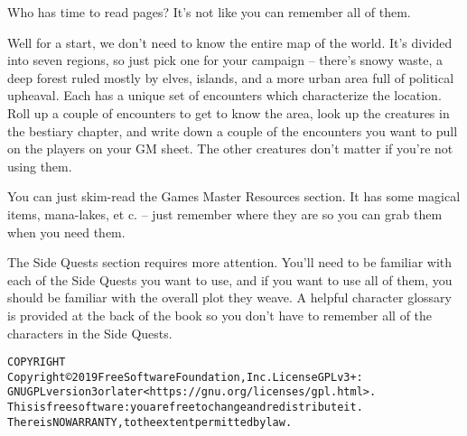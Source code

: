 \begin{multicols}{2}

\noindent Who has time to read \pageref{lastpage} pages?  It's not like you can remember all of them.

Well for a start, we don't need to know the entire map of the world.
It's divided into seven regions, so just pick one for your campaign -- there's snowy waste, a deep forest ruled mostly by elves, islands, and a more urban area full of political upheaval.
Each has a unique set of encounters which characterize the location.
Roll up a couple of encounters to get to know the area, look up the creatures in the bestiary chapter, and write down a couple of the encounters you want to pull on the players on your GM sheet.
The other creatures don't matter if you're not using them.

You can just skim-read the Games Master Resources section.
It has some magical items, mana-lakes, et c. -- just remember where they are so you can grab them when you need them.

The Side Quests section requires more attention.
You'll need to be familiar with each of the Side Quests you want to use, and if you want to use all of them, you should be familiar with the overall plot they weave.
A helpful character glossary is provided at the back of the book so you don't have to remember all of the characters in the Side Quests.

\end{multicols}

\begin{alltt}
COPYRIGHT
       Copyright \copyright 2019 Free Software Foundation, Inc.  License GPLv3+:
  GNU GPL version 3 or later <https://gnu.org/licenses/gpl.html>.
       This is free software: you are free to change and redistribute it.
  There is NO WARRANTY, to the extent permitted by law.

\end{alltt}
